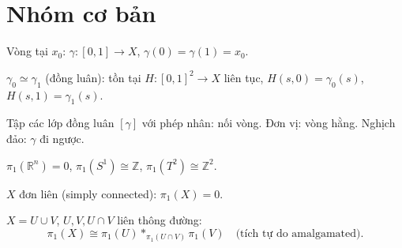 \documentclass[12pt,a4paper]{article}
\begin{document}
\section{Nhóm cơ bản}

\begin{dinhnghia}[title={Vòng (loop) và đồng luân (homotopy)}]
  Vòng tại $x_0$: $\gamma: [0,1] \to X$, $\gamma(0) = \gamma(1) = x_0$.

  $\gamma_0 \simeq \gamma_1$ (đồng luân): tồn tại $H: [0,1]^2 \to X$ liên tục, $H(s, 0) = \gamma_0(s)$, $H(s, 1) = \gamma_1(s)$.
\end{dinhnghia}

\begin{dinhnghia}[title={Nhóm cơ bản $\pi_1(X, x_0)$}]
  Tập các lớp đồng luân $[\gamma]$ với phép nhân: nối vòng. Đơn vị: vòng hằng. Nghịch đảo: $\gamma$ đi ngược.
\end{dinhnghia}

\begin{tinhchat}[title={Ví dụ}]
  $\pi_1(\mathbb{R}^n) = 0$, $\pi_1(S^1) \cong \mathbb{Z}$, $\pi_1(T^2) \cong \mathbb{Z}^2$.

  $X$ đơn liên (simply connected): $\pi_1(X) = 0$.
\end{tinhchat}

\begin{dinhly}[title={Seifert--van Kampen}]
  $X = U \cup V$, $U, V, U \cap V$ liên thông đường:
  \[
    \pi_1(X) \cong \pi_1(U) *_{\pi_1(U \cap V)} \pi_1(V) \quad \text{(tích tự do amalgamated)}.
  \]
\end{dinhly}
\end{document}
